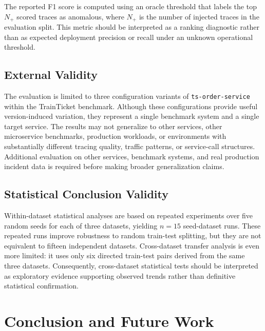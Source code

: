 \documentclass[informatics,article,submit,moreauthors]{Definitions/mdpi}
\begin{document}
The reported F1 score is computed using an oracle threshold that labels
the top \(N_+\) scored traces as anomalous, where \(N_+\) is the number
of injected traces in the evaluation split. This metric should be
interpreted as a ranking diagnostic rather than as expected deployment
precision or recall under an unknown operational threshold.

\subsection{External Validity}

The evaluation is limited to three configuration variants of
\texttt{ts-order-service} within the TrainTicket benchmark. Although
these configurations provide useful version-induced variation, they
represent a single benchmark system and a single target service. The
results may not generalize to other services, other microservice
benchmarks, production workloads, or environments with substantially
different tracing quality, traffic patterns, or service-call structures.
Additional evaluation on other services, benchmark systems, and real
production incident data is required before making broader
generalization claims.

\subsection{Statistical Conclusion Validity}

Within-dataset statistical analyses are based on repeated experiments
over five random seeds for each of three datasets, yielding \(n=15\)
seed-dataset runs. These repeated runs improve robustness to random
train-test splitting, but they are not equivalent to fifteen independent
datasets. Cross-dataset transfer analysis is even more limited: it uses
only six directed train-test pairs derived from the same three datasets.
Consequently, cross-dataset statistical tests should be interpreted as
exploratory evidence supporting observed trends rather than definitive
statistical confirmation.

\section{Conclusion and Future Work}
\label{sec:conclusion}
\end{document}
